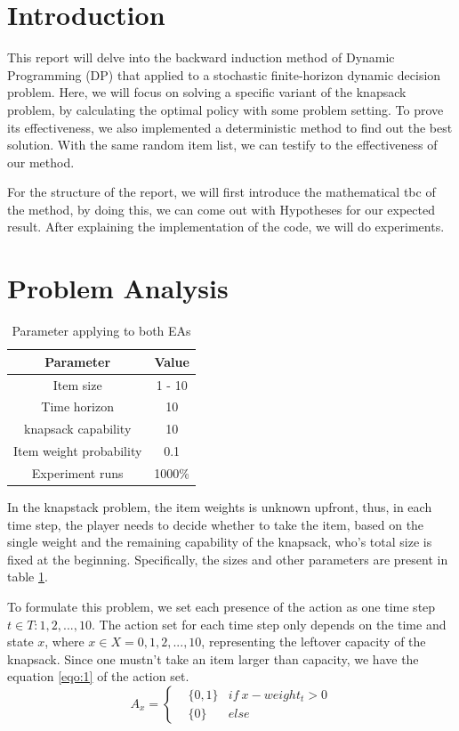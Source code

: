 
\section{Introduction}

This report will delve into the backward induction method of Dynamic Programming (DP) that applied to a stochastic finite-horizon dynamic decision problem. Here, we will focus on solving a specific variant of the knapsack problem, by calculating the optimal policy with some problem setting. To prove its effectiveness, we also implemented a deterministic method to find out the best solution. With the same random item list, we can testify to the effectiveness of our method. 

For the structure of the report, we will first introduce the mathematical {tbc} of the method, by doing this, we can come out with Hypotheses for our expected result. After explaining the implementation of the code, we will do experiments.
\section{Problem Analysis}
\begin{table}
    \centering
    \caption{Parameter applying to both EAs}
    \label{tab:my_label}
    \begin{tabular}{@{}cc@{}}
     \hline %
        Parameter & Value \\ \hline
        Item size & 1 - 10 \\
        Time horizon & 10 \\
        knapsack capability & 10 \\
        Item weight probability & 0.1 \\
        Experiment runs & 1000\% \\\hline
    \end{tabular}
\end{table}

In the knapstack problem, the item weights is unknown upfront, thus, in each time step, the player needs to decide whether to take the item, based on the single weight and the remaining capability of the knapsack, who's total size is fixed at the beginning. 
Specifically, the sizes and other parameters are present in table \ref{tab:my_label}.

To formulate this problem, we set each presence of the action as one time step $t \in T:{1,2,...,10}$. The action set for each time step only depends on the time and state $x$, where $x \in X = {0, 1, 2, ...,10}$, representing the leftover capacity of the knapsack. Since one mustn't take an item larger than capacity, we have the equation \ref{eqo:1} of the action set. 
\begin{equation}
\label{eqo:1}
A_x = \left\{
\begin{aligned}
    &\{0, 1\} & if\ x - weight_t >0 \\
    &\{0\} & else
\end{aligned}
\right.
\end{equation}


